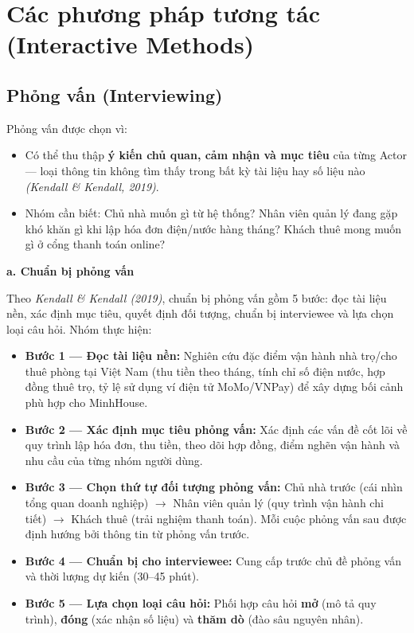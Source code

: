 \documentclass[12pt,a4paper]{report}
\begin{document}
\section{Các phương pháp tương tác (Interactive Methods)}

\subsection{Phỏng vấn (Interviewing)}

Phỏng vấn được chọn vì:

\begin{itemize}[leftmargin=1.2em,itemsep=2pt]
  \item Có thể thu thập \textbf{ý kiến chủ quan, cảm nhận và mục tiêu} của từng Actor --- loại thông tin không tìm thấy trong bất kỳ tài liệu hay số liệu nào \emph{(Kendall \& Kendall, 2019)}.
  \item Nhóm cần biết: Chủ nhà muốn gì từ hệ thống? Nhân viên quản lý đang gặp khó khăn gì khi lập hóa đơn điện/nước hàng tháng? Khách thuê mong muốn gì ở cổng thanh toán online?
\end{itemize}

\noindent\textbf{a. Chuẩn bị phỏng vấn}

Theo \emph{Kendall \& Kendall (2019)}, chuẩn bị phỏng vấn gồm 5 bước: đọc tài liệu nền, xác định mục tiêu, quyết định đối tượng, chuẩn bị interviewee và lựa chọn loại câu hỏi. Nhóm thực hiện:

\begin{itemize}[leftmargin=1.2em,itemsep=2pt]
  \item \textbf{Bước 1 --- Đọc tài liệu nền:} Nghiên cứu đặc điểm vận hành nhà trọ/cho thuê phòng tại Việt Nam (thu tiền theo tháng, tính chỉ số điện nước, hợp đồng thuê trọ, tỷ lệ sử dụng ví điện tử MoMo/VNPay) để xây dựng bối cảnh phù hợp cho MinhHouse.
  \item \textbf{Bước 2 --- Xác định mục tiêu phỏng vấn:} Xác định các vấn đề cốt lõi về quy trình lập hóa đơn, thu tiền, theo dõi hợp đồng, điểm nghẽn vận hành và nhu cầu của từng nhóm người dùng.
  \item \textbf{Bước 3 --- Chọn thứ tự đối tượng phỏng vấn:} Chủ nhà trước (cái nhìn tổng quan doanh nghiệp) $\rightarrow$ Nhân viên quản lý (quy trình vận hành chi tiết) $\rightarrow$ Khách thuê (trải nghiệm thanh toán). Mỗi cuộc phỏng vấn sau được định hướng bởi thông tin từ phỏng vấn trước.
  \item \textbf{Bước 4 --- Chuẩn bị cho interviewee:} Cung cấp trước chủ đề phỏng vấn và thời lượng dự kiến (30--45 phút).
  \item \textbf{Bước 5 --- Lựa chọn loại câu hỏi:} Phối hợp câu hỏi \textbf{mở} (mô tả quy trình), \textbf{đóng} (xác nhận số liệu) và \textbf{thăm dò} (đào sâu nguyên nhân).
\end{itemize}
\end{document}
